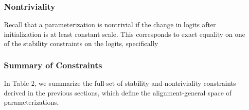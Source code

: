 \documentclass{article}
\theoremstyle{plain}
\theoremstyle{definition}
\theoremstyle{remark}
\begin{document}
\subsubsection{Nontriviality}
\label{app:theory_nontriviality}
Recall that a parameterization is nontrivial if the change in logits after initialization is at least constant scale. This corresponds to exact equality on one of the stability constraints on the logits, specifically
\begingroup
\renewcommand{\arraystretch}{1.5}
\begin{table}[h!]
\centering
{}
\end{table}
\endgroup

\subsubsection{Summary of Constraints}
\label{app:theory_summary_constraints}
In Table 2, we summarize the full set of stability and nontriviality constraints derived in the previous sections, which define the alignment-general space of parameterizations.
\clearpage
\newcommand{\STAB}[1]{\begin{tabular}{@{}c@{}}#1\end{tabular}}
\end{document}
